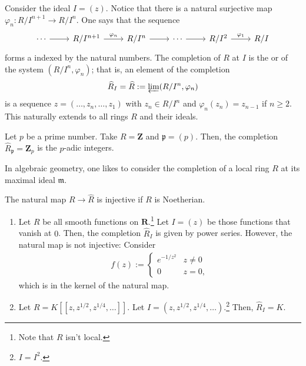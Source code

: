 \documentclass [11 pt, oneside] {article}
\begin{document}
Consider the ideal $I=(z)$. Notice that there is a natural surjective map $\varphi_n :R/I^{n+1} \longrightarrow R/I^{n}$. One says that the sequence
\[
\begin{tikzcd}
	\cdots\ar[r] &R/I^{n+1}\ar[r,"\varphi_n"]&R/I^n \ar[r] &\cdots\ar[r] &R/I^2 \ar[r,"\varphi_1"] &R/I 
\end{tikzcd}
\]
forms a  indexed by the natural numbers.
The completion of $R$ at $I$ is the  or  of the system $(R/I^n, \varphi_n)$; that is, an element of the completion
\begin{align*}
	\widehat{R}_I = \widehat{R} := \varprojlim (R/I^n, \varphi_n)
\end{align*}
is a sequence $z=(\hdots, z_n,\hdots,z_1)$ with $z_n\in R/I^n$ and $\varphi_n (z_n)=z_{n-1}$ if $n\ge 2$. This naturally extends to all rings $R$ and their ideals.

\begin{example}[ ]\label{}\text{}
Let $p$ be a prime number. Take $R=\mathbf{Z}$ and $\mathfrak{p}=(p)$. Then, the completion $\widehat{R}_{\mathfrak{p}} = \mathbf{Z}_p$ is the $p$-adic integers.
\end{example}

In algebraic geometry, one likes to consider the completion of a local ring $R$ at its maximal ideal $\mathfrak{m}$.

The natural map $R\longrightarrow \widehat{R}$ is injective if $R$ is Noetherian.

\begin{example}\label{}\text{}
\begin{enumerate}
	\item Let $R$ be all smooth functions on $\mathbf{R}$.\footnote{Note that $R$ isn't local.} Let $I=(z)$ be those functions that vanish at $0$. Then, the completion $\widehat{R}_I$ is given by power series. However, the natural map is not injective: Consider
		\begin{align*}
			f(z):=
			 \begin{cases}
				 e^{-1/z^2}&z\ne 0\\
				 0&z=0,
			\end{cases}
		\end{align*}
		which is in the kernel of the natural map.
	\item Let $R = K [\![z,z^{1/2},z^{1/4},\hdots]\!]$. Let $I=(z,z^{1/2},z^{1/4},\hdots)$.\footnote{$I=I^2$.} Then, $\widehat{R}_I = K$.
\end{enumerate}
\end{example}
\end{document}
